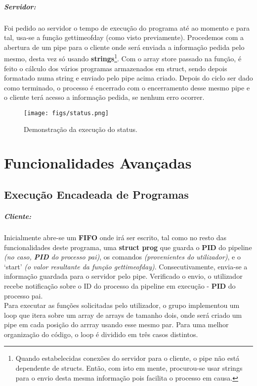 \documentclass{report}
\begin{document}
\subparagraph{Servidor:}

Foi pedido ao servidor o tempo de execução do programa até ao momento e para tal, usa-se a função gettimeofday (como visto previamente). Procedemos com a abertura de um pipe para o cliente onde será enviada a informação pedida pelo mesmo, desta vez só usando \textbf{strings}\footnote{Quando estabelecidas conexões do servidor para o cliente, o pipe não está dependente de structs. Então, com isto em mente, procurou-se usar strings para o envio desta mesma informação pois facilita o processo em causa.}.
Com o array store passado na função, é feito o cálculo dos vários programas armazenados em struct, sendo depois formatado numa string e enviado pelo pipe acima criado. Depois do ciclo ser dado como terminado, o processo é encerrado com o encerramento desse mesmo pipe e o cliente terá acesso a informação pedida, se nenhum erro ocorrer.\\

\begin{figure}[h]
    \centering
    \texttt{[image: figs/status.png]}
    \caption{Demonstração da execução do status.}
    \label{f}
\end{figure}

\section{Funcionalidades Avançadas}
\subsection{Execução Encadeada de Programas}

\subparagraph{Cliente:} Inicialmente abre-se um \textbf{FIFO} onde irá ser escrito, tal como no resto das funcionalidades deste programa, uma \textbf{struct prog} que guarda o \textbf{PID} do pipeline \textit{(no caso, \textbf{PID} do processo pai)}, os comandos \textit{(provenientes do utilizador)}, e o ‘start’ \textit{(o valor resultante da função gettimeofday)}. Consecutivamente, envia-se a informação guardada para o servidor pelo pipe. Verificado o envio, o utilizador recebe notificação sobre o ID do processo da pipeline em execução - \textbf{PID} do processo pai.\\

Para executar as funções solicitadas pelo utilizador, o grupo implementou um loop que itera sobre um array de arrays de tamanho dois, onde será criado um pipe em cada posição do arrray usando esse mesmo par. Para uma melhor organização do código, o loop é dividido em três casos distintos.
\end{document}
